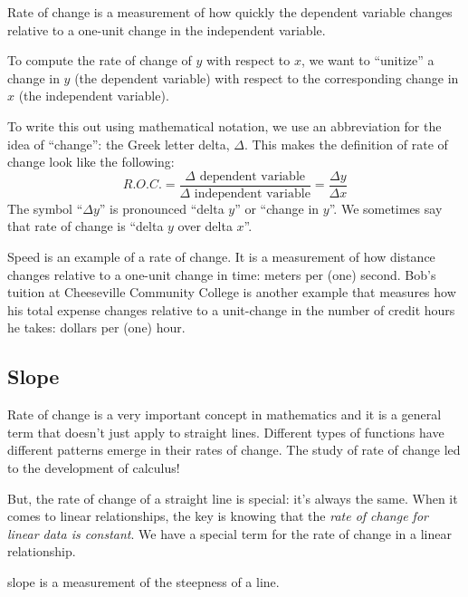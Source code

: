 \begin{boxeddef}
Rate of change is a measurement of how quickly the dependent variable changes relative to a one-unit change in the independent variable.
\end{boxeddef}

To compute the rate of change of $y$ with respect to $x$, we want to ``unitize'' a change in $y$ (the dependent variable) with respect to the corresponding change in $x$ (the independent variable).

To write this out using mathematical notation, we use an abbreviation for the idea of ``change'': the Greek letter delta, $\Delta$. This makes the definition of rate of change look like the following:
\[R.O.C. = \frac{\Delta \text{ dependent variable}}{\Delta \text{ independent variable}} = \frac{\Delta y}{\Delta x}\]
The symbol ``$\Delta y$'' is pronounced ``delta $y$'' or ``change in $y$''. We sometimes say that rate of change is ``delta $y$ over delta $x$''.


Speed is an example of a rate of change. It is a measurement of how distance changes relative to a one-unit change in time: meters per (one) second. Bob's tuition at Cheeseville Community College is another example that measures how his total expense changes relative to a unit-change in the number of credit hours he takes: dollars per (one) hour.


\subsection{Slope}

Rate of change is a very important concept in mathematics and it is a general term that doesn't just apply to straight lines. Different types of functions have different patterns emerge in their rates of change. The study of rate of change led to the development of calculus!

But, the rate of change of a straight line is special: it's always the same. When it comes to linear relationships, the key is knowing that the \textit{rate of change for linear data is constant}. We have a special term for the rate of change in a linear relationship.

\begin{boxeddef}[Slope]
\Gls{slope} is a measurement of the steepness of a line.
\end{boxeddef}

